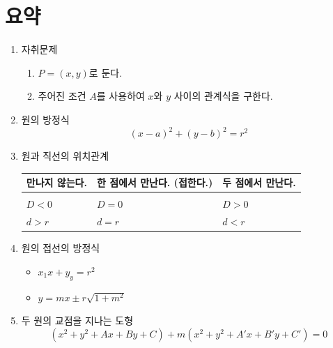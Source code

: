 \documentclass{oblivoir}
\begin{document}
\section*{요약}
\begin{enumerate}[label=\arabic*.,itemsep=2em]
\item
자취문제
\begin{enumerate}[label=\roman*)]
\item
\(P=(x,y)\)로 둔다.
\item
주어진 조건 \(A\)를 사용하여 \(x\)와 \(y\) 사이의 관계식을 구한다.
\end{enumerate}
\item
원의 방정식
\[(x-a)^2+(y-b)^2=r^2\]
\item
원과 직선의 위치관계\\[10pt]
\begin{tabu}to0.8\textwidth{X[c]|X[c]|X[c]}
\toprule
만나지 않는다.	&한 점에서 만난다. (접한다.)	&두 점에서 만난다.\\
\hline
&
&
\\\hline
\(D<0\)		&\(D=0\)	&\(D>0\)
\\\hline
\(d>r\)		&\(d=r\)	&\(d<r\)
\\\bottomrule
\end{tabu}
\item
원의 접선의 방정식
\begin{itemize}
\item
\(x_1x+y_y=r^2\)
\item
\(y=mx\pm r\sqrt{1+m^2}\)
\end{itemize}
\item
두 원의 교점을 지나는 도형
\[(x^2+y^2+Ax+By+C)+m(x^2+y^2+A'x+B'y+C')=0\]
\end{enumerate}
\end{document}
